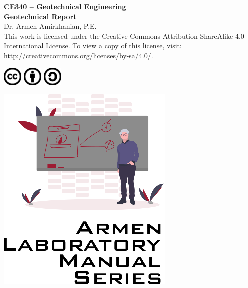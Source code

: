 \documentclass[12pt]{article}
\newcommand{\CourseNum}{CE340}
\newcommand{\CourseName}{Geotechnical Engineering}
\newcommand{\LabTitle}{Geotechnical Report}
\begin{document}
\begin{titlepage}
\begin{flushright}
\LARGE{\textbf{\CourseNum{} -- \CourseName}}\\
\vfill
\Huge{\textbf{\LabTitle}}\\
    \vfill
    \large Dr. Armen Amirkhanian, P.E.\\
\vfill
\normalsize This work is licensed under the Creative Commons Attribution-ShareAlike 4.0 International License. To view a copy of this license, visit:
\href{http://creativecommons.org/licenses/by-sa/4.0/}{http://creativecommons.org/licenses/by-sa/4.0/}.

\includegraphics[width=0.07\textwidth]{cc.eps}
\includegraphics[width=0.07\textwidth]{by.eps}
\includegraphics[width=0.07\textwidth]{sa.eps}
\vfill

\includegraphics[width=0.3\linewidth]{Logo.eps}\\ 
 
  
\end{flushright}
\end{titlepage}
\end{document}

